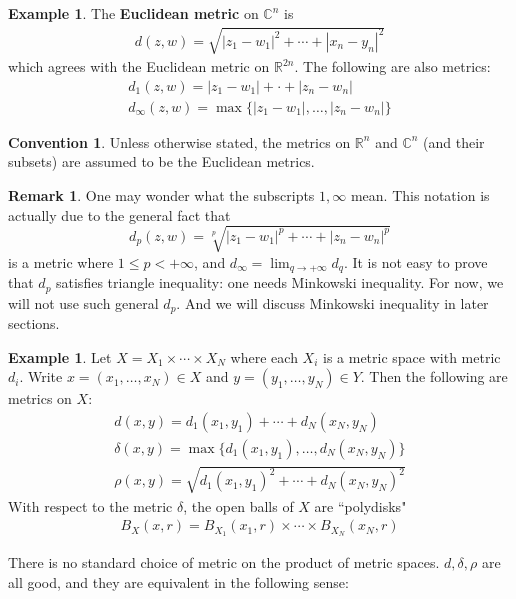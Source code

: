 \documentclass[12pt,b5paper,notitlepage]{article}
\theoremstyle{definition}
\newtheorem{eg}[df]{Example}
\newtheorem{rem}[df]{Remark}
\newtheorem{cv}[df]{Convention}
\theoremstyle{plain}
\newcommand{\Cbb}{\mathbb C}
\newcommand{\Rbb}{\mathbb R}
\numberwithin{equation}{section}
\begin{document}
\begin{eg}
The \textbf{Euclidean metric} on $\Cbb^n$ is
\begin{align*}
d(z,w)=\sqrt{|z_1-w_1|^2+\cdots+|x_n-y_n|^2}
\end{align*}
which agrees with the Euclidean metric on $\Rbb^{2n}$. The following are also metrics:
\begin{gather*}
d_1(z,w)=|z_1-w_1|+\cdot+|z_n-w_n|\\
d_\infty(z,w)=\max\{|z_1-w_1|,\dots,|z_n-w_n|\}
\end{gather*}
\end{eg}

\begin{cv}\label{lb33}
Unless otherwise stated, the metrics on $\Rbb^n$ and $\Cbb^n$ (and their subsets) are assumed to be the Euclidean metrics.
\end{cv}


\begin{rem}
One may wonder what the subscripts $1,\infty$ mean. This notation is actually due to the general fact that
\begin{equation*}
d_p(z,w)=\sqrt[p]{|z_1-w_1|^p+\cdots+|z_n-w_n|^p}
\end{equation*}
is a metric where $1\leq p< +\infty$, and $d_\infty=\lim_{q\rightarrow +\infty}d_q$. It is not easy to prove that $d_p$ satisfies triangle inequality: one needs Minkowski inequality. For now, we will not use such general $d_p$. And we will discuss Minkowski inequality in later sections.
\end{rem}


\begin{eg}\label{lb19}
Let $X=X_1\times\cdots\times X_N$ where each $X_i$ is a metric space with metric $d_i$. Write $x=(x_1,\dots,x_N)\in X$ and $y=(y_1,\dots,y_N)\in Y$. Then the following are metrics on $X$:
\begin{gather*}
d(x,y)=d_1(x_1,y_1)+\cdots+d_N(x_N,y_N)\\
\delta(x,y)=\max\{d_1(x_1,y_1),\dots,d_N(x_N,y_N)\}\\
\rho(x,y)=\sqrt{d_1(x_1,y_1)^2+\cdots+d_N(x_N,y_N)^2}
\end{gather*}
With respect to the metric $\delta$, the open balls of $X$ are ``polydisks"
\begin{align*}
B_X(x,r)=B_{X_1}(x_1,r)\times\cdots\times B_{X_N}(x_N,r)
\end{align*}
\end{eg}


There is no standard choice of metric on the product of metric spaces. $d,\delta,\rho$ are all good, and they are equivalent in the following sense:
\end{document}
